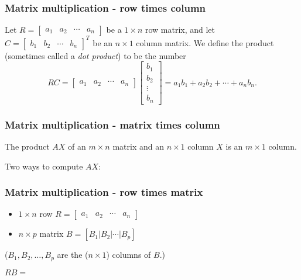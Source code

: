 \documentclass[12pt,t]{beamer}
\begin{document}
\begin{frame}\frametitle{Matrix multiplication - row times column}
 Let $R=\begin{bmatrix}a_1 & a_2 & \cdots & a_n\end{bmatrix}$ be a $1\times n$ row matrix, and let $C=\begin{bmatrix}b_1 & b_2 & \cdots & b_n\end{bmatrix}^T$ be an $n\times 1$ column matrix. We define the \alert{product} (sometimes called a {\em dot product}) to be the number
\[
 RC = \begin{bmatrix}a_1 & a_2 & \cdots & a_n\end{bmatrix}\begin{bmatrix}b_1 \\ b_2 \\ \vdots \\ b_n\end{bmatrix} = a_1b_1+a_2b_2+\cdots + a_nb_n.
\]

\end{frame}
\begin{frame}\frametitle{Matrix multiplication - matrix times column}
 The product $AX$ of an $m\times n$ matrix and an $n\times 1$ column $X$ is an $m\times 1$ column.

\bigskip

Two ways to compute $AX$:
\end{frame}
\begin{frame}\frametitle{Matrix multiplication - row times matrix}
\begin{itemize}
 \item $1\times n$ row $R=\begin{bmatrix}a_1&a_2&\cdots&a_n\end{bmatrix}$
 \item $n\times p$ matrix $B=[B_1|B_2|\cdots|B_p]$
\end{itemize}
($B_1, B_2,\ldots, B_p$ are the ($n\times 1$) columns of $B$.)

\bigskip

$RB=$

\end{frame}
\end{document}
